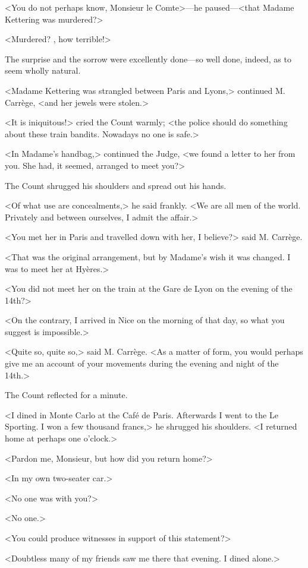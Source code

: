 <You do not perhaps know, Monsieur le Comte>—he paused—<that Madame Kettering was murdered?>

<Murdered? , how terrible!>

The surprise and the sorrow were excellently done—so well done, indeed, as to seem wholly natural.

<Madame Kettering was strangled between Paris and Lyons,> continued M. Carrège, <and her jewels were stolen.>

<It is iniquitous!> cried the Count warmly; <the police should do something about these train bandits. Nowadays no one is safe.>

<In Madame's handbag,> continued the Judge, <we found a letter to her from you. She had, it seemed, arranged to meet you?>

The Count shrugged his shoulders and spread out his hands.

<Of what use are concealments,> he said frankly. <We are all men of the world. Privately and between ourselves, I admit the affair.>

<You met her in Paris and travelled down with her, I believe?> said M. Carrège.

<That was the original arrangement, but by Madame's wish it was changed. I was to meet her at Hyères.>

<You did not meet her on the train at the Gare de Lyon on the evening of the 14th?>

<On the contrary, I arrived in Nice on the morning of that day, so what you suggest is impossible.>

<Quite so, quite so,> said M. Carrège. <As a matter of form, you would perhaps give me an account of your movements during the evening and night of the 14th.>

The Count reflected for a minute.

<I dined in Monte Carlo at the Café de Paris. Afterwards I went to the Le Sporting. I won a few thousand francs,> he shrugged his shoulders. <I returned home at perhaps one o'clock.>

<Pardon me, Monsieur, but how did you return home?>

<In my own two-seater car.>

<No one was with you?>

<No one.>

<You could produce witnesses in support of this statement?>

<Doubtless many of my friends saw me there that evening. I dined alone.>

